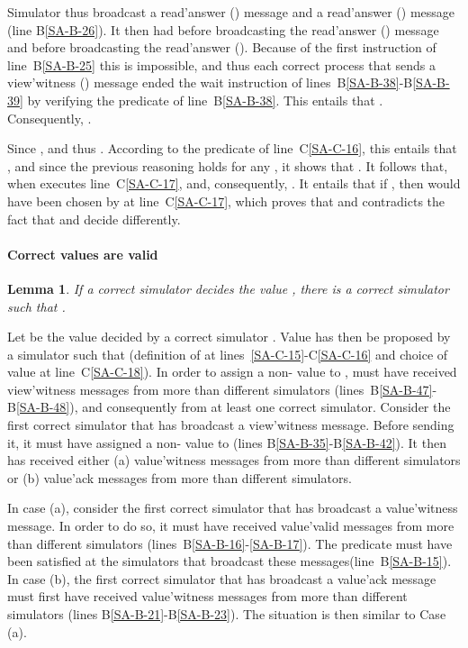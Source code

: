 \documentclass[11pt,letterpaper]{article}
\newtheorem{lemma}{Lemma}
\newlength {\afterproof}
\newcommand{\toto}{xxx}
\newenvironment{proofL}{\noindent{\bf Proof }}
{\hspace*{\fill}\par\vspace{\afterproof}}
\begin{document}
\begin{proofL}
Simulator  thus broadcast a {\sc read'answer} () message
and a {\sc read'answer} () message (line B\ref{SA-B-26}). It then 
had   before broadcasting the  
{\sc read'answer} () message and  before 
broadcasting the {\sc read'answer} ().
Because of the first instruction of line~B\ref{SA-B-25} this is impossible,
and thus each correct
process that sends a {\sc view'witness} () message ended
the wait instruction
of   lines~B\ref{SA-B-38}-B\ref{SA-B-39}  by   verifying  the   predicate  of
line~B\ref{SA-B-38}. 
This entails that
.   Consequently, .

Since ,  and thus
.
According to the predicate of line~C\ref{SA-C-16}, this entails that
, and since the previous reasoning holds for any
, it shows that .
It follows that, when  executes line~C\ref{SA-C-17},  and,
consequently, . It entails that if
,
then  would have been chosen by  at
line~C\ref{SA-C-17}, which proves that 
and contradicts the fact that  and  decide differently.
\renewcommand{\toto}{lemma:safe-byz-agreement}
\end{proofL}




\paragraph{Correct values are valid}
\begin{lemma}
\label{lemma-correct-is-valid}
If a correct simulator  decides the value , there is 
a correct simulator  such that .
\end{lemma}
\begin{proofL}


Let  be the value decided by a correct simulator . Value  has
then be proposed by a simulator  such that 
(definition of  at lines~\ref{SA-C-15}-C\ref{SA-C-16} 
and choice of value at 
line~C\ref{SA-C-18}). In order to assign a non- value to 
,  must have received {\sc view'witness}
messages from more than  different  simulators 
(lines~B\ref{SA-B-47}-B\ref{SA-B-48}), and 
consequently from at least one correct 
simulator. Consider the first correct simulator  that has broadcast a
{\sc view'witness} message. Before sending it, it must have assigned 
a non- value to  (lines B\ref{SA-B-35}-B\ref{SA-B-42}).
It then has received either (a) {\sc value'witness} messages from 
more than  different  simulators or 
(b) {\sc value'ack} messages from more than  different  
simulators.

In case (a), consider the first correct simulator  that has 
broadcast a {\sc value'witness} message. In order to do so, 
it must have received {\sc value'valid} messages from more 
than  different  
simulators (lines~B\ref{SA-B-16}-\ref{SA-B-17}).
The predicate  must have been satisfied at the 
simulators that broadcast these messages(line~B\ref{SA-B-15}). 
In case (b), the first correct simulator  that has 
broadcast a {\sc value'ack} message must first have received 
{\sc value'witness} messages from more than  
different  simulators (lines B\ref{SA-B-21}-B\ref{SA-B-23}). 
The situation is then similar to Case (a).
\renewcommand{\toto}{lemma-correct-is-valid}
\end{proofL}
\end{document}
